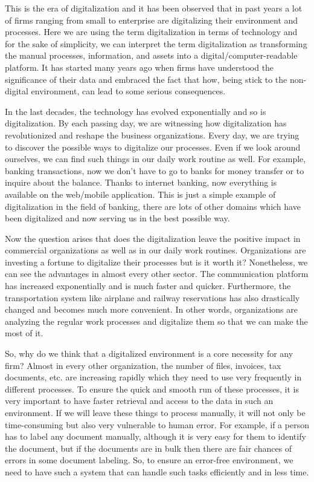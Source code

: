 This is the era of digitalization and it has been observed that in past years a lot of firms ranging from small to enterprise are digitalizing their environment and processes. Here we are using the term digitalization in terms of technology and for the sake of simplicity, we can interpret the term digitalization as transforming the manual processes, information, and assets into a digital/computer-readable platform. It has started many years ago when firms have understood the significance of their data and embraced the fact that how, being stick to the non-digital environment, can lead to some serious consequences.
\newline
\par
In the last decades, the technology has evolved exponentially and so is digitalization. By each passing day, we are witnessing how digitalization has revolutionized and reshape the business organizations. Every day, we are trying to discover the possible ways to digitalize our processes. Even if we look around ourselves, we can find such things in our daily work routine as well. For example, banking transactions, now we don't have to go to banks for money transfer or to inquire about the balance. Thanks to internet banking, now everything is available on the web/mobile application. This is just a simple example of digitalization in the field of banking, there are lots of other domains which have been digitalized and now serving us in the best possible way.
\newline
\par
Now the question arises that does the digitalization leave the positive impact in commercial organizations as well as in our daily work routines. Organizations are investing a fortune to digitalize their processes but is it worth it? Nonetheless, we can see the advantages in almost every other sector. The communication platform has increased exponentially and is much faster and quicker. Furthermore, the transportation system like airplane and railway reservations has also drastically changed and becomes much more convenient. In other words, organizations are analyzing the regular work processes and digitalize them so that we can make the most of it.
\newline
\par
So, why do we think that a digitalized environment is a core necessity for any firm? Almost in every other organization, the number of files, invoices, tax documents, etc. are increasing rapidly which they need to use very frequently in different processes. To ensure the quick and smooth run of these processes, it is very important to have faster retrieval and access to the data in such an environment. If we will leave these things to process manually, it will not only be time-consuming but also very vulnerable to human error. For example, if a person has to label any document manually, although it is very easy for them to identify the document, but if the documents are in bulk then there are fair chances of errors in some document labeling. So, to ensure an error-free environment, we need to have such a system that can handle such tasks efficiently and in less time.
